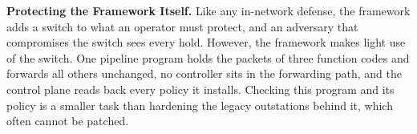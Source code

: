 \textbf{Protecting the Framework Itself.} Like any in-network defense, the framework adds a switch to
what an operator must protect, and an adversary that compromises the switch sees every hold. However,
the framework makes light use of the switch. One pipeline program holds the packets of three
function codes and forwards all others unchanged, no controller sits in the forwarding path, and the
control plane reads back every policy it installs. Checking this program and its policy is a smaller
task than hardening the legacy outstations behind it, which often cannot be patched.
